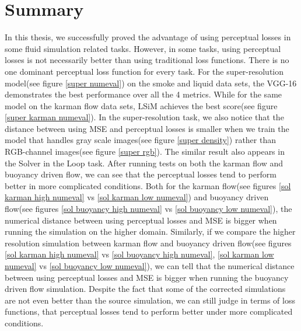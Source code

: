 \documentclass[a4paper,12pt,twoside]{report}
\begin{document}
\section{Summary}
In this thesis, we successfully proved the advantage of using perceptual losses in some fluid simulation related tasks. However, in some tasks, using perceptual losses is not necessarily better than using traditional loss functions. There is no one dominant perceptual loss function for every task. For the super-resolution model(see figure \ref{super numeval}) on the smoke and liquid data sets, the VGG-16 demonstrates the best performance over all the 4 metrics. While for the same model on the karman flow data sets, LSiM achieves the best score(see figure \ref{super karman numeval}). 
In the super-resolution task, we also notice that the distance between using MSE and perceptual losses is smaller when we train the model that handles gray scale images(see figure \ref{super density}) rather than RGB-channel images(see figure \ref{super rgb}). The similar result also appears in the Solver in the Loop task. After running tests on both the karman flow and buoyancy driven flow, we can see that the perceptual losses tend to perform better in more complicated conditions. Both for the karman flow(see figures \ref{sol karman high numeval} vs \ref{sol karman low numeval}) and buoyancy driven flow(see figures \ref{sol buoyancy high numeval} vs \ref{sol buoyancy low numeval}), the numerical distance between using perceptual losses and MSE is bigger when running the simulation on the higher domain. Similarly, if we compare the higher resolution simulation between karman flow and buoyancy driven flow(see figures \ref{sol karman high numeval} vs \ref{sol buoyancy high numeval}, \ref{sol karman low numeval} vs \ref{sol buoyancy low numeval}), we can tell that the numerical distance between using perceptual losses and MSE is bigger when running the buoyancy driven flow simulation. Despite the fact that some of the corrected simulations are not even better than the source simulation, we can still judge in terms of loss functions, that perceptual losses tend to perform better under more complicated conditions. 




\appendix
\end{document}
